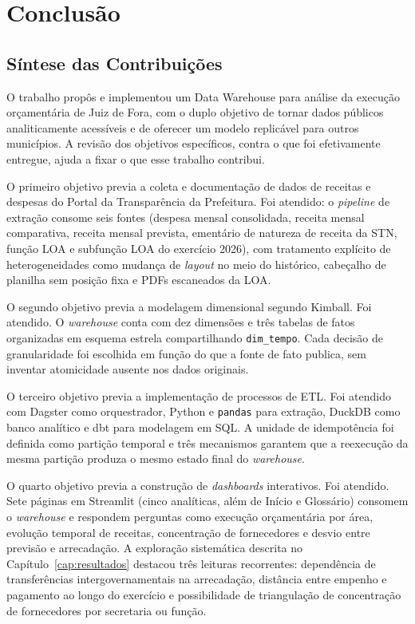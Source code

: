 \chapter{Conclusão}
\label{cap:conclusao}

\section{Síntese das Contribuições}

O trabalho propôs e implementou um Data Warehouse para análise da execução orçamentária de Juiz de Fora, com o duplo objetivo de tornar dados públicos analiticamente acessíveis e de oferecer um modelo replicável para outros municípios. A revisão dos objetivos específicos, contra o que foi efetivamente entregue, ajuda a fixar o que esse trabalho contribui.

O primeiro objetivo previa a coleta e documentação de dados de receitas e despesas do Portal da Transparência da Prefeitura. Foi atendido: o \textit{pipeline} de extração consome seis fontes (despesa mensal consolidada, receita mensal comparativa, receita mensal prevista, ementário de natureza de receita da STN, função LOA e subfunção LOA do exercício 2026), com tratamento explícito de heterogeneidades como mudança de \textit{layout} no meio do histórico, cabeçalho de planilha sem posição fixa e PDFs escaneados da LOA.

O segundo objetivo previa a modelagem dimensional segundo Kimball. Foi atendido. O \textit{warehouse} conta com dez dimensões e três tabelas de fatos organizadas em esquema estrela compartilhando \texttt{dim\_tempo}. Cada decisão de granularidade foi escolhida em função do que a fonte de fato publica, sem inventar atomicidade ausente nos dados originais.

O terceiro objetivo previa a implementação de processos de ETL. Foi atendido com Dagster como orquestrador, Python e \texttt{pandas} para extração, DuckDB como banco analítico e dbt para modelagem em SQL. A unidade de idempotência foi definida como partição temporal e três mecanismos garantem que a reexecução da mesma partição produza o mesmo estado final do \textit{warehouse}.

O quarto objetivo previa a construção de \textit{dashboards} interativos. Foi atendido. Sete páginas em Streamlit (cinco analíticas, além de Início e Glossário) consomem o \textit{warehouse} e respondem perguntas como execução orçamentária por área, evolução temporal de receitas, concentração de fornecedores e desvio entre previsão e arrecadação. A exploração sistemática descrita no Capítulo~\ref{cap:resultados} destacou três leituras recorrentes: dependência de transferências intergovernamentais na arrecadação, distância entre empenho e pagamento ao longo do exercício e possibilidade de triangulação de concentração de fornecedores por secretaria ou função.

